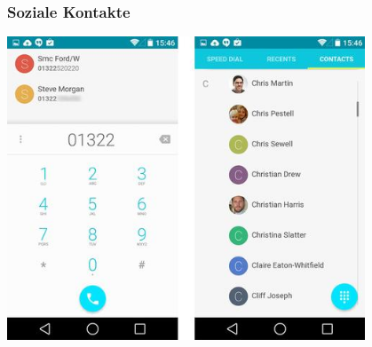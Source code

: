 \begin{frame}
	\frametitle{Soziale Kontakte}
	\begin{center}
		\includegraphics[width=0.8\textwidth]{../../img/phone-contacts.jpg}
	\end{center}
\end{frame}

